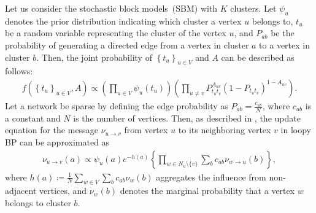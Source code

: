 \documentclass{article}
\theoremstyle{plain}
\begin{document}
Let us consider the stochastic block models~(SBM) with $K$ clusters. Let $\psi_u$ denotes the prior distribution indicating which cluster a vertex $u$ belongs to, $t_u$ be a random variable representing the cluster of the vertex $u$, and $P_{ab}$ be the probability of generating a directed edge from a vertex in cluster $a$ to a vertex in cluster $b$. Then, the joint probability of $\left\{ t_u \right\}_{u \in V}$ and $A$ can be described as follows:
\begin{align*}
	f(\left\{ t_u \right\}_{u \in V}, A) \propto \left( \prod_{u \in V} \psi_u(t_u) \right) \left( \prod_{u\neq v} P_{t_u t_v}^{A_{uv}} \left(1 - P_{t_u t_v}\right)^{1-A_{uv}} \right)
	.
\end{align*}
Let a network be sparse by defining the edge probability as $P_{ab} = \frac{c_{ab}}{N}$,
where $c_{ab}$ is a constant and $N$ is the number of vertices.
Then, as described in \citep{Decelle2011-ir},
the update equation for the message $\nu_{u\to v}$ from vertex $u$ to its neighboring vertex $v$ in loopy BP can be approximated as
\begin{align*}
	\nu_{u\to v}(a) \propto \psi_{u}(a) e^{-h(a)} \left\{ \prod_{w \in N_u \setminus \{v\}} \sum_{b} c_{ab} \nu_{w\to u}(b) \right\}
	,
\end{align*}
where $h(a) \coloneqq \frac{1}{N}\sum_{w \in V} \sum_{b} c_{ab} \nu_{w}(b)$ aggregates the influence from non-adjacent vertices, and $\nu_{w}(b)$ denotes the marginal probability that a vertex $w$ belongs to cluster $b$.
\end{document}

